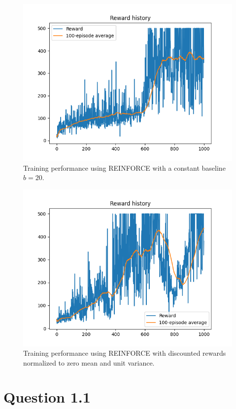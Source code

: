 \documentclass[12pt]{article}
\begin{document}
\begin{figure}[pht] 
	\centering  %
    \includegraphics[width=0.8\columnwidth]{img/Figure_2_task_1b_cumulative_reward.png}
	\caption{Training performance using REINFORCE with a constant baseline $b = 20$.}
	\label{fig:fig2}
\end{figure}


\begin{figure}[phb] 
	\centering  %
    \includegraphics[width=0.8\columnwidth]{img/Figure_3_task_1c_cumulative_reward.png}
	\caption{Training performance using REINFORCE with discounted rewards normalized to zero mean and unit variance.}
	\label{fig:fig3}
\end{figure}


\pagebreak


\section*{Question 1.1}
\end{document}
